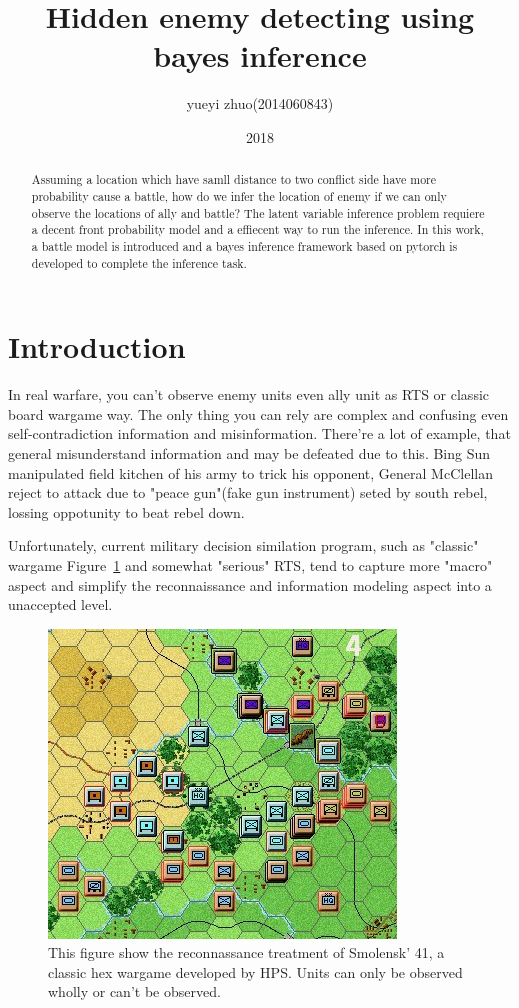 \documentclass{article}
\title{Hidden enemy detecting using bayes inference}
\author{yueyi zhuo(2014060843)}
\date{2018}
\begin{document}
\maketitle

\begin{abstract}

Assuming a location which have samll distance to two conflict side have more probability cause a battle,
how do we infer the location of enemy if we can only observe the locations of ally and battle? The latent
variable inference problem requiere a decent front probability model and a effiecent way to run the 
inference. In this work, a battle model is introduced and a bayes inference framework based on pytorch 
is developed to complete the inference task.

\end{abstract}

\section{Introduction}

In real warfare, you can't observe enemy units even ally unit as RTS or classic board wargame way.
The only thing you can rely are complex and confusing even self-contradiction information and misinformation.
There're a lot of example, that general misunderstand information and may be defeated due to this. 
Bing Sun manipulated field kitchen of his army to trick his opponent, General McClellan reject to attack
due to "peace gun"(fake gun instrument) seted by south rebel, lossing oppotunity to beat rebel down.

Unfortunately, current military decision similation program, such as "classic" wargame Figure~\ref{fig:hps} and somewhat 
"serious" RTS, tend to capture more "macro" aspect and simplify the reconnaissance and 
information modeling aspect into a unaccepted level.

\begin{figure}[h!]
\includegraphics[width=0.6\linewidth]{SmolenskR4.jpg}
\caption{This figure show the reconnassance treatment of Smolensk' 41, 
a classic hex wargame developed by HPS.
Units can only be observed wholly or can't be observed. }
\label{fig:hps}
\end{figure}
\end{document}
